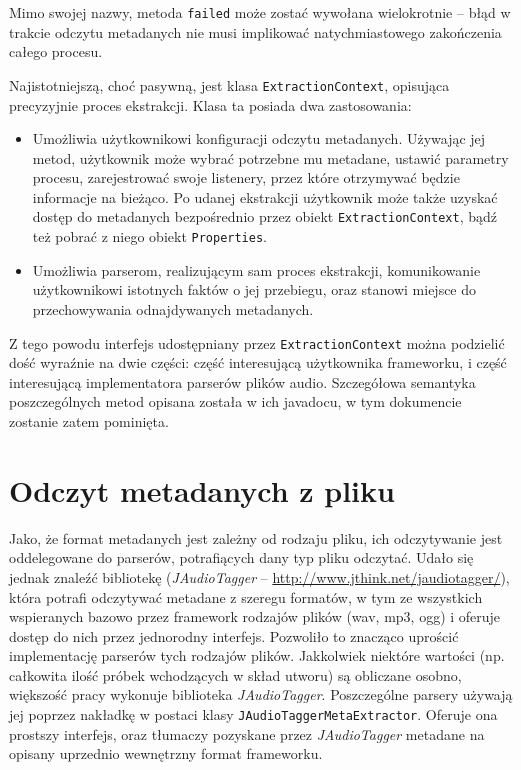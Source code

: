 \begin{Note}
Mimo swojej nazwy, metoda \texttt{failed} może zostać wywołana wielokrotnie -- błąd w trakcie
odczytu metadanych nie musi implikować natychmiastowego zakończenia całego procesu.
\end{Note}


Najistotniejszą, choć pasywną, jest klasa \texttt{ExtractionContext}, opisująca precyzyjnie proces
ekstrakcji. Klasa ta posiada dwa zastosowania:

\begin{itemize}
  \item Umożliwia użytkownikowi konfiguracji odczytu metadanych. Używając jej metod, użytkownik może
wybrać potrzebne mu metadane, ustawić parametry procesu, zarejestrować swoje listenery, przez które
otrzymywać będzie informacje na bieżąco. Po udanej ekstrakcji użytkownik może także uzyskać dostęp
do metadanych bezpośrednio przez obiekt \texttt{ExtractionContext}, bądź też pobrać z niego obiekt
\texttt{Properties}.

  \item Umożliwia parserom, realizującym sam proces ekstrakcji, komunikowanie użytkownikowi
istotnych faktów o jej przebiegu, oraz stanowi miejsce do przechowywania odnajdywanych metadanych.

\end{itemize}

Z tego powodu interfejs udostępniany przez \texttt{ExtractionContext} można podzielić dość wyraźnie
na dwie części: część interesującą użytkownika frameworku, i część interesującą implementatora
parserów plików audio. Szczegółowa semantyka poszczególnych metod opisana została w ich javadocu,
w tym dokumencie zostanie zatem pominięta.


\section{Odczyt metadanych z pliku}

Jako, że format metadanych jest zależny od rodzaju pliku, ich odczytywanie jest oddelegowane do
parserów, potrafiących dany typ pliku odczytać. Udało się jednak znaleźć bibliotekę
(\emph{JAudioTagger} -- \url{http://www.jthink.net/jaudiotagger/}), która potrafi odczytywać
metadane z szeregu formatów, w tym ze wszystkich wspieranych bazowo przez framework rodzajów plików
(wav, mp3, ogg) i oferuje dostęp do nich przez jednorodny interfejs. Pozwoliło to znacząco uprościć
implementację parserów tych rodzajów plików.  Jakkolwiek niektóre wartości (np. całkowita ilość
próbek wchodzących w skład utworu) są obliczane osobno, większość pracy wykonuje biblioteka
\emph{JAudioTagger}. Poszczególne parsery używają jej poprzez nakładkę w postaci klasy
\texttt{JAudioTaggerMetaExtractor}. Oferuje ona prostszy interfejs, oraz tłumaczy pozyskane przez
\emph{JAudioTagger} metadane na opisany uprzednio wewnętrzny format frameworku.


